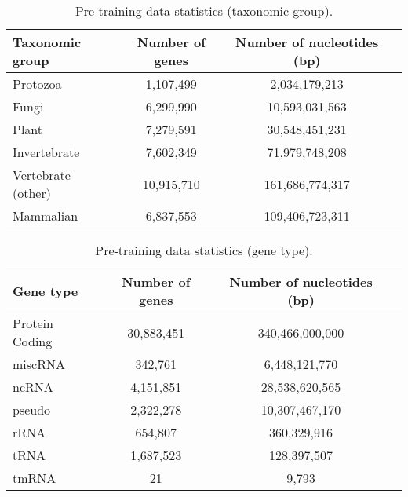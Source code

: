 \begin{table*}[!htb]
\small
\renewcommand{\arraystretch}{1.2}
\centering
\caption{Pre-training data statistics (taxonomic group).}
\begin{tabular}{lccc}
\toprule
Taxonomic group & Number of genes & Number of nucleotides (bp) \\
\midrule
Protozoa & 1,107,499 & 2,034,179,213 \\
Fungi & 6,299,990 & 10,593,031,563 \\
Plant & 7,279,591 & 30,548,451,231 \\
Invertebrate & 7,602,349 & 71,979,748,208 \\
Vertebrate (other) & 10,915,710 & 161,686,774,317 \\
Mammalian & 6,837,553 & 109,406,723,311 \\
\bottomrule
\end{tabular}
\label{tab:pretrain_data_statistics_species}
\end{table*}

\begin{table*}[!htb]
\small
\renewcommand{\arraystretch}{1.2}
\centering
\caption{Pre-training data statistics (gene type).}
\begin{tabular}{lccc}
\toprule
Gene type & Number of genes & Number of nucleotides (bp) \\
\midrule
Protein Coding & 30,883,451 & 340,466,000,000 \\
miscRNA & 342,761 & 6,448,121,770 \\
ncRNA & 4,151,851 & 28,538,620,565 \\
pseudo & 2,322,278 & 10,307,467,170 \\
rRNA & 654,807 & 360,329,916 \\
tRNA & 1,687,523 & 128,397,507 \\
tmRNA & 21 & 9,793 \\
\bottomrule
\end{tabular}
\label{tab:pretrain_data_statistics_gene}
\end{table*}